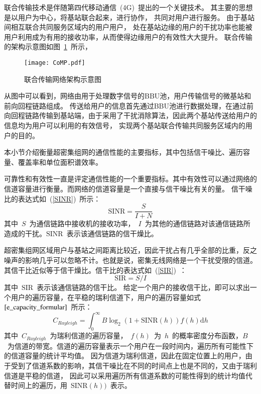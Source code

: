 联合传输技术是伴随第四代移动通信~(4G)~提出的一个关键技术。
其主要的思想是以用户为中心，将基站联合起来，进行协作，
共同对用户进行服务。
由于基站间相互联合共同服务区域内的用户用户，
处在基站边缘的用户的干扰功率也能被用户利用成为有用的接收功率，从而使得边缘用户的有效性大大提升。
联合传输的架构示意图如图~\ref{CoMP}~所示，
\begin{figure}[htbp]
\centering
\texttt{[image: CoMP.pdf]}
\caption{联合传输网络架构示意图}\vspace{-0.5em}
\label{CoMP}
\end{figure}
从图中可以看到，网络由用于处理数字信号的BBU池，用户传输信号的微基站和前向回程链路组成。
传送给用户的信息首先通过BBU池进行数据处理，在通过前向回程链路传输到基站端，由于采用了干扰消除算法，因此两个基站传送给用户的信息均为用户可以利用的有效信号，
实现两个基站联合传输共同服务区域内的用户的目的。


本小节介绍衡量超密集组网的通信性能的主要指标，其中包括信干噪比、遍历容量、覆盖率和单位面积谱效率。


可靠性和有效性一直是评定通信性能的一个重要指标。其中有效性可以通过网络的信道容量进行衡量。而网络的信道容量是一个直接与信干噪比有关的量。
信干噪比的表达式如~(\ref{SINR})~所示：
\begin{equation}\label{SINR}
  \mathrm{SINR}=\frac{S}{I+N}
\end{equation}
其中~$S$~为通信链路中接收机的接收功率，~$I$~为其他的通信链路对该通信链路所造成的干扰。$\mathrm{SINR}$~表示该通信链路的信干燥比。

超密集组网区域用户与基站之间距离比较近，因此干扰占有几乎全部的比重，反之噪声的影响几乎可以忽略不计。也就是说，密集无线网络是一个干扰受限的信道。其信干比近似等于信干燥比。信干比的表达式如~(\ref{SIR})~：
\begin{equation}\label{SIR}
  \mathrm{SIR}=S/I
\end{equation}
其中~$\mathrm{SIR}$~表示该通信链路的信干比。
给定一个用户的接收信干比，即可以求出一个用户的遍历容量，在平稳的瑞利信道下，用户的遍历容量如式~$\ref{e_capacity_formular}$~所示：
\begin{equation}\label{e_capacity_formular}
  C_{Rayleigh} = \int_{0}^{\infty} B \log_2(1+\mathrm{SINR}(h)) f(h) \mathrm{d} h
\end{equation}
其中~$C_{Rayleigh}$~为瑞利信道的遍历容量，~$f(h)$~为~$h$~的概率密度分布函数，$B$~为信道的带宽。信道的遍历容量表示一个用户在一段时间内，遍历所有可能性下的信道容量的统计平均值。
因为信道为瑞利信道，因此在固定位置上的用户，由于受到了信道系数的影响，其信干噪比在不同的时间点上也是不同的，又由于瑞利信道是平稳的信道，
因此可以采用遍历所有信道系数的可能性得到的统计均值代替时间上的遍历，用~$\mathrm{SINR}(h))$~表示。

